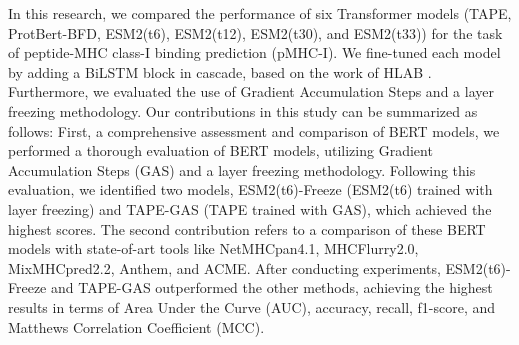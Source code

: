 In this research, we compared the performance of six Transformer models (TAPE, ProtBert-BFD, ESM2(t6), ESM2(t12), ESM2(t30), and ESM2(t33)) for the task of peptide-MHC class-I binding prediction (pMHC-I). We fine-tuned each model by adding a BiLSTM block in cascade, based on the work of HLAB \cite{zhang2022hlab}. Furthermore, we evaluated the use of Gradient Accumulation Steps and a layer freezing methodology. Our contributions in this study can be summarized as follows: First, a comprehensive assessment and comparison of BERT models, we performed a thorough evaluation of BERT models, utilizing Gradient Accumulation Steps (GAS) and a layer freezing methodology. Following this evaluation, we identified two models, ESM2(t6)-Freeze (ESM2(t6) trained with layer freezing) and TAPE-GAS (TAPE trained with GAS), which achieved the highest scores. The second contribution refers to a comparison of these BERT models with state-of-art tools like NetMHCpan4.1, MHCFlurry2.0, MixMHCpred2.2, Anthem, and ACME. After conducting experiments, ESM2(t6)-Freeze and TAPE-GAS outperformed the other methods, achieving the highest results in terms of Area Under the Curve (AUC), accuracy, recall, f1-score, and Matthews Correlation Coefficient (MCC).



